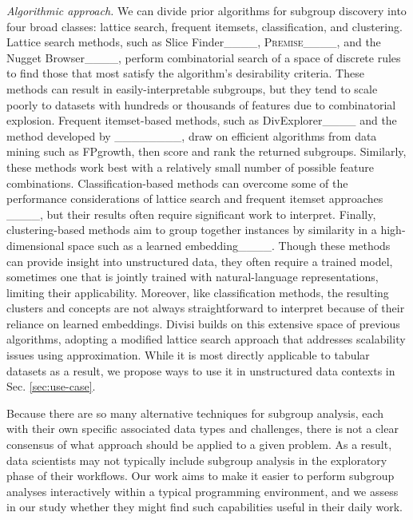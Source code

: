 \textit{Algorithmic approach.} We can divide prior algorithms for subgroup discovery into four broad classes: lattice search, frequent itemsets, classification, and clustering.
Lattice search methods, such as Slice Finder____, \textsc{Premise}____, and the Nugget Browser____, perform combinatorial search of a space of discrete rules to find those that most satisfy the algorithm's desirability criteria.
These methods can result in easily-interpretable subgroups, but they tend to scale poorly to datasets with hundreds or thousands of features due to combinatorial explosion.
Frequent itemset-based methods, such as DivExplorer____ and the method developed by ________, draw on efficient algorithms from data mining such as FPgrowth, then score and rank the returned subgroups.
Similarly, these methods work best with a relatively small number of possible feature combinations.
Classification-based methods can overcome some of the performance considerations of lattice search and frequent itemset approaches ____, but their results often require significant work to interpret.
Finally, clustering-based methods aim to group together instances by similarity in a high-dimensional space such as a learned embedding____.
Though these methods can provide insight into unstructured data, they often require a trained model, sometimes one that is jointly trained with natural-language representations, limiting their applicability.
Moreover, like classification methods, the resulting clusters and concepts are not always straightforward to interpret because of their reliance on learned embeddings.
Divisi builds on this extensive space of previous algorithms, adopting a modified lattice search approach that addresses scalability issues using approximation.
While it is most directly applicable to tabular datasets as a result, we propose ways to use it in unstructured data contexts in Sec. \ref{sec:use-case}.

Because there are so many alternative techniques for subgroup analysis, each with their own specific associated data types and challenges, there is not a clear consensus of what approach should be applied to a given problem.
As a result, data scientists may not typically include subgroup analysis in the exploratory phase of their workflows.
Our work aims to make it easier to perform subgroup analyses interactively within a typical programming environment, and we assess in our study whether they might find such capabilities useful in their daily work.

